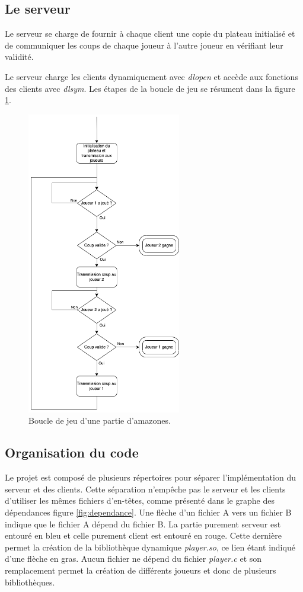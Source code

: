 \documentclass[a4paper]{article}
\begin{document}
\subsection{Le serveur}
Le serveur se charge de fournir à chaque client une copie du plateau initialisé et de communiquer les coups de chaque joueur à l'autre joueur en vérifiant leur validité.

Le serveur charge les clients dynamiquement avec \emph{dlopen} et accède aux fonctions des clients avec \emph{dlsym}. Les étapes de la boucle de jeu se résument dans la figure \ref{fig:boucle}.

\begin{figure}
    \centering
    \includegraphics[width=0.6\textwidth]{bouclejeu.png}
    \caption{Boucle de jeu d'une partie d'amazones.}
    \label{fig:boucle}
\end{figure}

\subsection{Organisation du code}
Le projet est composé de plusieurs répertoires pour séparer l'implémentation du serveur et des clients. Cette séparation n'empêche pas le serveur et les clients d'utiliser les mêmes fichiers d'en-têtes, comme présenté dans le graphe des dépendances figure \ref{fig:dependance}. Une flèche d'un fichier A vers un fichier B indique que le fichier A dépend du fichier B. La partie purement serveur est entouré en bleu et celle purement client est entouré en rouge. Cette dernière permet la création de la bibliothèque dynamique \emph{player.so}, ce lien étant indiqué d'une flèche en gras. Aucun fichier ne dépend du fichier \emph{player.c} et son remplacement permet la création de différents joueurs et donc de plusieurs bibliothèques.
\end{document}
